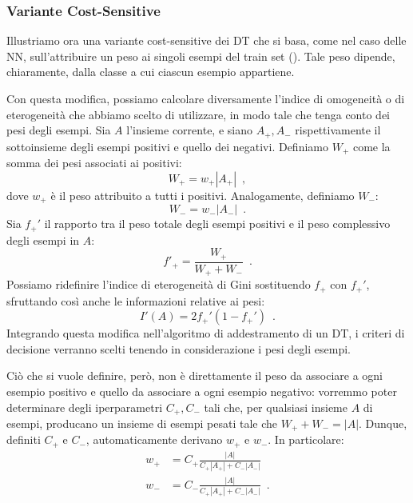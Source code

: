 \subsubsection{Variante Cost-Sensitive}
Illustriamo ora una variante cost-sensitive dei DT che si basa, come nel caso delle NN, sull'attribuire un peso ai singoli esempi del train set (\cite{ting2002dt}). Tale peso dipende, chiaramente, dalla classe a cui ciascun esempio appartiene. 

Con questa modifica, possiamo calcolare diversamente l'indice di omogeneità o di eterogeneità che abbiamo scelto di utilizzare, in modo tale che tenga conto dei pesi degli esempi. Sia $A$ l'insieme corrente, e siano $A_+, A_-$ rispettivamente il sottoinsieme degli esempi positivi e quello dei negativi. Definiamo $W_+$ come la somma dei pesi associati ai positivi:
\begin{equation}
    W_+ = w_+ |A_+| \enspace,
\end{equation}
dove $w_+$ è il peso attribuito a tutti i positivi. Analogamente, definiamo $W_-$:
\begin{equation}
    W_- = w_- |A_-| \enspace.
\end{equation}
Sia $f_+'$ il rapporto tra il peso totale degli esempi positivi e il peso complessivo degli esempi in $A$:
\begin{equation}
    f'_+ = \frac{W_+}{W_+ + W_-} \enspace.
\end{equation}
Possiamo ridefinire l'indice di eterogeneità di Gini sostituendo $f_+$ con $f_+'$, sfruttando così anche le informazioni relative ai pesi:
\begin{equation}
    I'(A) = 2f_+'(1-f_+') \enspace.
\end{equation}
Integrando questa modifica nell'algoritmo di addestramento di un DT, i criteri di decisione verranno scelti tenendo in considerazione i pesi degli esempi.

Ciò che si vuole definire, però, non è direttamente il peso da associare a ogni esempio positivo e quello da associare a ogni esempio negativo: vorremmo poter determinare degli iperparametri $C_+, C_-$ tali che, per qualsiasi insieme $A$ di esempi, producano un insieme di esempi pesati tale che $W_+ + W_- = |A|$. 
Dunque, definiti $C_+$ e $C_-$, automaticamente derivano $w_+$ e $w_-$. In particolare:
\begin{equation}
    \begin{aligned}
        w_+ &= C_+ \frac{|A|}{C_+|A_+| + C_-|A_-|} \\
        w_- &= C_- \frac{|A|}{C_+|A_+| + C_-|A_-|} \enspace.
    \end{aligned}
\end{equation}